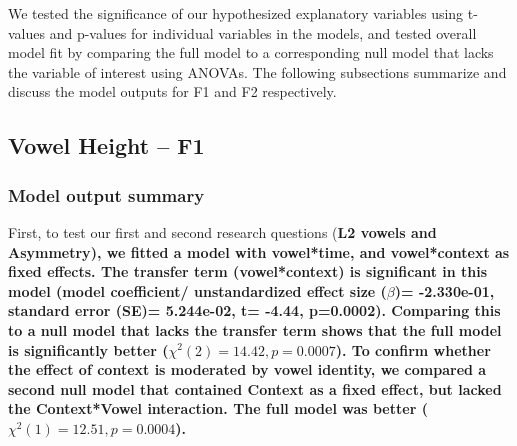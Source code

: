 \documentclass[12 pt]{article}
\begin{document}
We tested the significance of our hypothesized explanatory variables using t-values and p-values for individual variables in the models, and tested overall model fit by comparing the full model to a corresponding null model that lacks the variable of interest using ANOVAs. The following subsections summarize and discuss the model outputs for F1 and F2 respectively.



\subsection{Vowel Height -- F1}

\subsubsection*{Model output summary}

First, to test our first and second research questions (\bf{L2 vowels and Asymmetry}), we fitted a model with vowel*time, and vowel*context as fixed effects. The transfer term (vowel*context) is significant in this model (model coefficient/ unstandardized effect size ($\beta$)= -2.330e-01, standard error (SE)=  5.244e-02, t= -4.44, p=0.0002). Comparing this to a null model that lacks the transfer term shows that the full model is significantly better ($\chi^2(2) = 14.42, p=  0.0007$). To confirm whether the effect of context is moderated by vowel identity, we compared a second null model that contained Context as a fixed effect, but lacked the Context*Vowel interaction. The full model was better ($\chi^2(1) = 12.51, p= 0.0004$).
\end{document}

